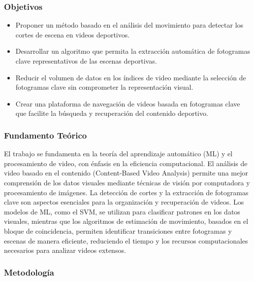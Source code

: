 \subsubsection{Objetivos}
\begin{itemize}
	\item Proponer un método basado en el análisis del movimiento para detectar los cortes de escena en videos deportivos.
	\item Desarrollar un algoritmo que permita la extracción automática de fotogramas clave representativos de las escenas deportivas.
	\item Reducir el volumen de datos en los índices de video mediante la selección de fotogramas clave sin comprometer la representación visual.
	\item Crear una plataforma de navegación de videos basada en fotogramas clave que facilite la búsqueda y recuperación del contenido deportivo.
\end{itemize}

\subsubsection{Fundamento Teórico}
El trabajo se fundamenta en la teoría del aprendizaje automático (ML) y el procesamiento de video, con énfasis en la eficiencia computacional. El análisis de video basado en el contenido (Content-Based Video Analysis) permite una mejor comprensión de los datos visuales mediante técnicas de visión por computadora y procesamiento de imágenes. La detección de cortes y la extracción de fotogramas clave son aspectos esenciales para la organización y recuperación de videos. Los modelos de ML, como el SVM, se utilizan para clasificar patrones en los datos visuales, mientras que los algoritmos de estimación de movimiento, basados en el bloque de coincidencia, permiten identificar transiciones entre fotogramas y escenas de manera eficiente, reduciendo el tiempo y los recursos computacionales necesarios para analizar videos extensos.

\subsubsection{Metodología}

